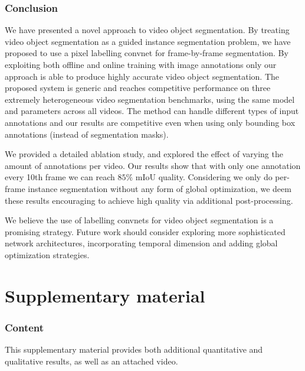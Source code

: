 \documentclass[10pt,twocolumn,letterpaper]{article}
\begin{document}
 \section{Conclusion}
\label{sec:conclusion}


We have presented a novel approach to video object segmentation. By treating video object segmentation as a guided instance segmentation problem,
we have proposed to use a pixel labelling convnet for frame-by-frame segmentation.
By exploiting both offline and online training with image annotations only our approach is able to produce highly accurate video object segmentation.
The proposed system is generic and reaches competitive performance on three extremely heterogeneous video segmentation benchmarks, using the same model and parameters across all videos.
The method can handle different types of input annotations and our results are competitive even when using only bounding box annotations (instead of segmentation masks).

We provided a detailed ablation study, and explored the effect of varying the amount of annotations per video.
Our results show that with only one annotation every 10th frame we can reach $85\%$ mIoU quality.
Considering we only do per-frame instance segmentation without any form of global optimization,
we deem these results encouraging to achieve high quality via additional post-processing.

We believe the use of labelling convnets for video object segmentation is a promising strategy. Future work should consider exploring more sophisticated network architectures, incorporating temporal dimension
and adding global optimization strategies.
 
\FloatBarrier
{\small


}

\renewcommand{\thetable}{S\arabic{table}}
\renewcommand{\thefigure}{S\arabic{figure}}

\newpage
\clearpage
\appendix
\part*{Supplementary material}
\section{Content}
\label{sec:content}

This supplementary material provides both additional
quantitative and qualitative results, as well as an attached
video.
\end{document}
